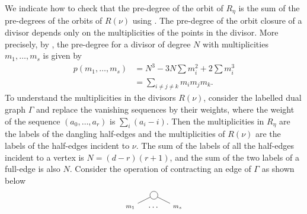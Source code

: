 \documentclass[11pt]{amsart}
\begin{document}
\begin{remark}\label{rem:deg}
  We indicate how to check that the pre-degree of the orbit of \(R_\eta\) is the sum of the pre-degrees of the orbits of \(R(\nu)\) using \cite[Proposition~1.3]{alu.fab:93*1}.
  The pre-degree of the orbit closure of a divisor depends only on the multiplicities of the points in the divisor.
  More precisely, by \cite[Proposition~1.3]{alu.fab:93*1}, the pre-degree for a divisor of degree \(N\) with multiplicities \(m_1, \dots, m_s\) is given by
  \begin{equation}\label{eq:ijk}
    \begin{split}
      p(m_1, \dots, m_s) &= N^3 - 3N \sum m_i^2 + 2 \sum m_i^3\\
      &= \sum_{i \neq j \neq k}m_im_jm_k.
    \end{split}
  \end{equation}
  To understand the multiplicities in the divisors \(R(\nu)\), consider the labelled dual graph \(\Gamma\) and replace the vanishing sequences by their weights, where the weight of the sequence \((a_0, \dots, a_r)\) is \(\sum_i (a_i-i)\).
  Then the multiplicities in \(R_\eta\) are the labels of the dangling half-edges and the multiplicities of \(R(\nu)\) are the labels of the half-edges incident to \(\nu\).
  The sum of the labels of all the half-edges incident to a vertex is \(N = (d-r)(r+1)\), and the sum of the two labels of a full-edge is also \(N\).
  Consider the operation of contracting an edge of \(\Gamma\) as shown below
  \[
    \begin{tikzpicture}
      \draw (0,0) node[draw, circle] (X) {};
      \draw (-1,-0.5) node (X1) {\scriptsize \(m_1\)} (0,-0.5) node (X2) {\dots} (1,-0.5) node (X3) {\scriptsize \(m_s\)};
      \draw (X) edge (X1) edge (X3);
  

\end{tikzpicture}\]
\end{remark}
\end{document}
